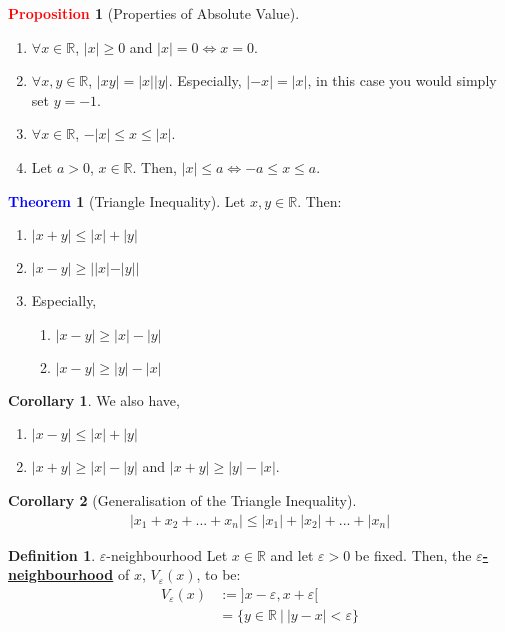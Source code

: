 \documentclass[11pt]{article}
\theoremstyle{definition}
\newcommand{\R}[0]{\mathbb{R}}
\newcommand{\dfn}[1]{\textbf{{\underline{#1}}}}
\newtheorem{theorem}{\textcolor{blue}{Theorem}}
\newtheorem{corollary}{Corollary}
\theoremstyle{definition}
\newtheorem{definition}{\textcolor{OliveGreen}{Definition}}
\newtheorem{prop}{\textcolor{red}{Proposition}}
\theoremstyle{remark}
\begin{document}
\begin{prop}[Properties of Absolute Value]
	\begin{enumerate}[noitemsep]
		\item $\forall x \in \R$, $|x| \geq 0$ and $|x| = 0 \iff x =0$. 
		\item $\forall x, y \in \R$, $|xy| = |x||y|$. Especially, $|-x| = |x|$, in this case you would simply set $y = -1$. 
		\item $\forall x \in \R$, $-|x| \leq x \leq |x|$.
		\item Let $a > 0$, $x \in \R$. Then, $|x| \leq a \iff -a \leq x \leq a$.
	\end{enumerate}
\end{prop}

\begin{theorem}[Triangle Inequality]
	Let $x, y \in \R$. Then: 
	\begin{enumerate}[noitemsep]
		\item $|x+y| \leq |x| + |y| $ 
		\item $|x-y| \geq | |x| - |y| | $ 
		\item Especially, 
		\begin{enumerate}[noitemsep]
			\item $|x-y| \geq |x| - |y| $ 
			\item $|x-y| \geq |y| - |x|$
		\end{enumerate}
	\end{enumerate}
\end{theorem}

\begin{corollary}
	We also have, 
	\begin{enumerate}[noitemsep]
		\item $|x-y| \leq |x|+ |y| $ 
		\item $|x+y| \geq |x| - |y|$ and $|x+y| \geq |y| - |x|$.
	\end{enumerate}
\end{corollary}

\begin{corollary}[Generalisation of the Triangle Inequality]
	\begin{align}
		|x_1 + x_2 + ... + x_n | \leq |x_1| + |x_2| + ... + |x_n |	
	\end{align}
\end{corollary}


\begin{definition}{$\varepsilon$-neighbourhood}
	Let $x \in \R$ and let $\varepsilon > 0$ be fixed. Then, the \dfn{$\varepsilon$-neighbourhood} of $x$, $V_\varepsilon(x)$, to be: 
	\begin{align*}
		V_\varepsilon(x) & := ]x- \varepsilon, x+ \varepsilon [ \\
						 & = \{ y \in \R\ |\ |y-x| < \varepsilon \} 	
	\end{align*}
\end{definition}
\end{document}
